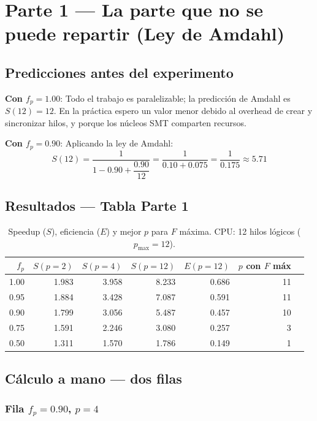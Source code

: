 \documentclass[12pt,letterpaper]{article}
\begin{document}
\section{Parte 1 — La parte que no se puede repartir (Ley de Amdahl)}

\subsection{Predicciones antes del experimento}

\textbf{Con \boldmath$f_p = 1.00$}: Todo el trabajo es paralelizable; la predicción de Amdahl es $S(12) = 12$. En la práctica espero un valor menor debido al overhead de crear y sincronizar hilos, y porque los núcleos SMT comparten recursos.

\textbf{Con \boldmath$f_p = 0.90$}: Aplicando la ley de Amdahl:
\[
S(12) = \frac{1}{1 - 0.90 + \dfrac{0.90}{12}} = \frac{1}{0.10 + 0.075} = \frac{1}{0.175} \approx 5.71
\]

\subsection{Resultados — Tabla Parte 1}

\begin{table}[H]
\centering
\caption{Speedup ($S$), eficiencia ($E$) y mejor $p$ para $F$ máxima. CPU: 12 hilos lógicos ($p_{\max}=12$).}
\begin{tabular}{rrrrrrr}
\toprule
$f_p$ & $S(p=2)$ & $S(p=4)$ & $S(p=12)$ & $E(p=12)$ & $p$ con $F$ máx \\
\midrule
1.00 & 1.983 & 3.958 & 8.233 & 0.686 & 11 \\
0.95 & 1.884 & 3.428 & 7.087 & 0.591 & 11 \\
0.90 & 1.799 & 3.056 & 5.487 & 0.457 & 10 \\
0.75 & 1.591 & 2.246 & 3.080 & 0.257 & 3  \\
0.50 & 1.311 & 1.570 & 1.786 & 0.149 & 1  \\
\bottomrule
\end{tabular}
\end{table}

\subsection{Cálculo a mano — dos filas}

\subsubsection*{Fila $f_p = 0.90$, $p = 4$}
\end{document}
